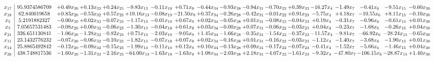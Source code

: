 \documentclass[9pt]{article}
\begin{document}
 \[\begin{array}{c| c c@{\hskip 2pt} c@{\hskip 2pt} c@{\hskip 2pt} c@{\hskip 2pt} c@{\hskip 2pt} c@{\hskip 2pt} c@{\hskip 2pt} c@{\hskip 2pt} c@{\hskip 2pt} c@{\hskip 2pt} c@{\hskip 2pt} c@{\hskip 2pt} c@{\hskip 2pt} c@{\hskip 2pt} c@{\hskip 2pt} c@{\hskip 2pt} }
 x_{17}   &  95.9374586709 & +  0.49 x_{20} & +  0.13 x_{32} & +  0.24 x_{25} & -9.83 x_{13} & -0.11 x_{19} & +  0.71 x_{9} & -0.44 x_{34} & -0.93 x_{28} & -0.94 x_{31} & -0.70 x_{22} & +  0.39 x_{23} & -16.27 x_{4} & -1.49 x_{7} & -0.41 x_{6} & -9.51 x_{15} & -0.60 x_{30}\\
 x_{18}   &  62.840019658 & +  0.83 x_{20} & -0.53 x_{32} & +  0.57 x_{25} & + 19.16 x_{13} & -0.08 x_{19} & -21.50 x_{9} & +  0.37 x_{34} & -0.26 x_{28} & -0.42 x_{31} & -0.01 x_{22} & +  0.91 x_{23} & -5.75 x_{4} & +  4.18 x_{7} & -10.55 x_{6} & +  8.11 x_{15} & -0.10 x_{30}\\
 x_{5}   &  5.2191882327 & -0.00 x_{20} & +  0.02 x_{32} & -0.07 x_{25} & -1.17 x_{13} & -0.01 x_{19} & +  0.67 x_{9} & +  0.02 x_{34} & -0.05 x_{28} & +  0.01 x_{31} & -0.08 x_{22} & -0.04 x_{23} & +  0.19 x_{4} & -0.31 x_{7} & -0.96 x_{6} & -0.61 x_{15} & +  0.01 x_{30}\\
 x_{3}   &  7.05657531483 & -0.08 x_{20} & +  0.00 x_{32} & -0.06 x_{25} & -1.30 x_{13} & -0.04 x_{19} & +  0.61 x_{9} & +  0.03 x_{34} & -0.00 x_{28} & +  0.07 x_{31} & -0.06 x_{22} & -0.03 x_{23} & +  0.04 x_{4} & -0.23 x_{7} & -1.68 x_{6} & -0.26 x_{15} & +  0.04 x_{30}\\
 x_{21}   &  326.651130841 & -1.06 x_{20} & -1.28 x_{32} & -0.82 x_{25} & +  0.71 x_{13} & -2.03 x_{19} & -9.05 x_{9} & +  1.45 x_{34} & -1.66 x_{28} & -0.35 x_{31} & -1.54 x_{22} & -0.37 x_{23} & -11.57 x_{4} & -9.81 x_{7} & -66.92 x_{6} & -28.24 x_{15} & -0.65 x_{30}\\
 x_{11}   &  23.1432776232 & -0.07 x_{20} & -0.06 x_{32} & -0.10 x_{25} & -1.82 x_{13} & -0.07 x_{19} & +  0.07 x_{9} & +  0.02 x_{34} & -0.16 x_{28} & +  0.01 x_{31} & -0.16 x_{22} & -0.03 x_{23} & -1.12 x_{4} & -1.40 x_{7} & -3.68 x_{6} & -1.90 x_{15} & +  0.01 x_{30}\\
 x_{14}   &  25.8865492842 & -0.12 x_{20} & -0.09 x_{32} & -0.15 x_{25} & -1.99 x_{13} & -0.11 x_{19} & +  0.12 x_{9} & +  0.10 x_{34} & -0.13 x_{28} & +  0.09 x_{31} & -0.17 x_{22} & -0.07 x_{23} & -0.41 x_{4} & -1.52 x_{7} & -5.66 x_{6} & -1.46 x_{15} & +  0.04 x_{30}\\
 x_{26}   &  438.748817536 & -1.60 x_{20} & -1.31 x_{32} & -2.16 x_{25} & -64.00 x_{13} & -1.63 x_{19} & -1.63 x_{9} & +  1.08 x_{34} & -2.03 x_{28} & +  2.18 x_{31} & -4.07 x_{22} & -1.61 x_{23} & -9.32 x_{4} & -47.80 x_{7} & -106.15 x_{6} & -28.87 x_{15} & +  1.40 x_{30}\\

\end{array}\]
\end{document}
